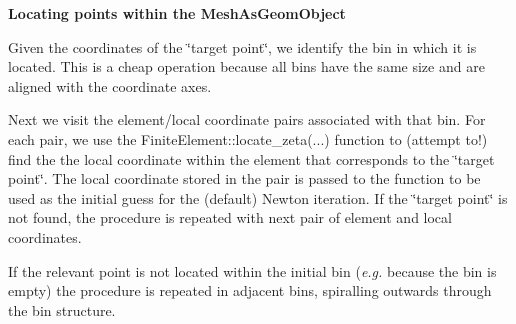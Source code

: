 \begin{center} {\bfseries Locating points within the {\ttfamily Mesh\+As\+Geom\+Object}} \end{center} 
\begin{DoxyEnumerate}
\item Given the coordinates of the \char`\"{}target point\char`\"{}, we identify the bin in which it is located. This is a cheap operation because all bins have the same size and are aligned with the coordinate axes. ~\newline
~\newline

\item Next we visit the element/local coordinate pairs associated with that bin. For each pair, we use the {\ttfamily Finite\+Element\+::locate\+\_\+zeta}(...) function to (attempt to!) find the the local coordinate within the element that corresponds to the \char`\"{}target point\char`\"{}. The local coordinate stored in the pair is passed to the function to be used as the initial guess for the (default) Newton iteration. If the \char`\"{}target point\char`\"{} is not found, the procedure is repeated with next pair of element and local coordinates. ~\newline
~\newline

\item If the relevant point is not located within the initial bin ({\itshape  e.\+g. } because the bin is empty) the procedure is repeated in adjacent bins, spiralling outwards through the bin structure. ~\newline
~\newline


\end{DoxyEnumerate}
